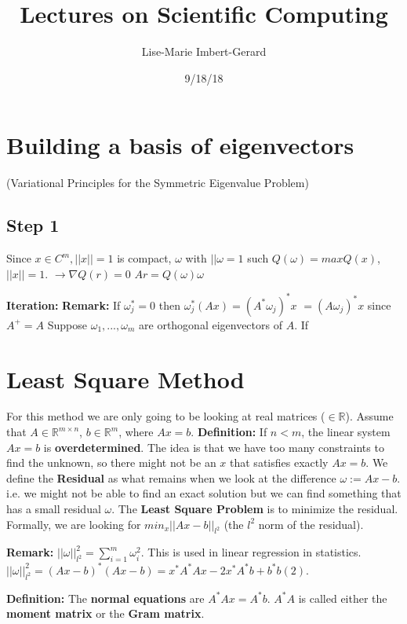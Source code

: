 \documentclass{article}
\title{Lectures on Scientific Computing}
\date{9/18/18}
\author{Lise-Marie Imbert-Gerard}
\newcommand{\n}{\newline}
\begin{document}
	\maketitle
	\section{Building a basis of eigenvectors}
	(Variational Principles for the Symmetric Eigenvalue Problem)
	\subsection{Step 1}
	Since $x\in C^{m}, ||x||=1$ is compact, $\omega$ with $||\omega=1$ such $Q(\omega)=maxQ(x)$, $||x||=1$.\n
	$\rightarrow \nabla Q(r)=0$\n
	$Ar=Q(\omega)\omega$
	\begin{flushleft}
	\textbf{Iteration: \n}
	\textbf{Remark: } If $\omega_{j}^{*}=0$ then $\omega_{j}^{*}(Ax)=(A^{*}\omega_{j})^{*}x$ \n
	$=(A\omega_{j})^{*}x$ since $A^{+}=A$
	Suppose $\omega_{1},...,\omega_{m}$ are orthogonal eigenvectors of $A$.  If 
	\end{flushleft}
	
	\section{Least Square Method}
	
	For this method we are only going to be looking at real matrices ($\in\mathbb{R}$).  Assume that $A\in\mathbb{R}^{m\times n}$, $b\in\mathbb{R}^{m}$, where $Ax=b$. \n
	\textbf{Definition: \n} If $n<m$, the linear system $Ax=b$ is \textbf{overdetermined}.  The idea is that we have too many constraints to find the unknown, so there might not be an $x$ that satisfies exactly $Ax=b$.  We define the \textbf{Residual} as what remains when we look at the difference $\omega:=Ax-b$.  i.e. we might not be able to find an exact solution but we can find something that has a small residual $\omega$.  The \textbf{Least Square Problem} is to minimize the residual.  Formally, we are looking for $min_{x}||Ax-b||_{l^{2}}$ (the $l^{2}$ norm of the residual).  \n
	
	\textbf{Remark:} $||\omega||_{l^{2}}^{2}=\sum_{i=1}^{m}\omega_{i}^{2}$.  This is used in linear regression in statistics.  $||\omega||^{2}_{l^{2}}=(Ax-b)^{*}(Ax-b)=x^{*}A^{*}Ax-2x^{*}A^{*}b+b^{*}b(2)$.\n
	
	\textbf{Definition: } The \textbf{normal equations} are $A^{*}Ax=A^{*}b$.  $A^{*}A$ is called either the \textbf{moment matrix} or the \textbf{Gram matrix}.  \n
	
\end{document}
